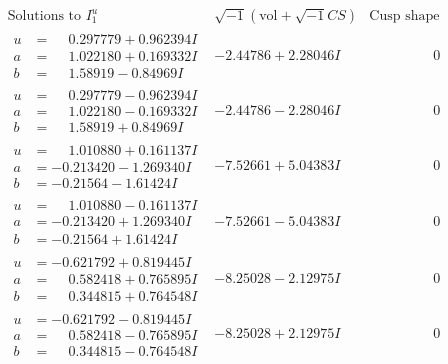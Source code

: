\documentclass[1p]{elsarticle_modified}
\theoremstyle{definition}
\newcommand{\I}{\sqrt{-1}}
\begin{document}
$$\begin{array}{c|c|c}  
\text{Solutions to }I^u_{1}& \I (\text{vol} + \sqrt{-1}CS) & \text{Cusp shape}\\
 \hline 
\begin{aligned}
u &= \phantom{-}0.297779 + 0.962394 I \\
a &= \phantom{-}1.022180 + 0.169332 I \\
b &= \phantom{-}1.58919 - 0.84969 I\end{aligned}
 & -2.44786 + 2.28046 I & \phantom{-0.000000 } 0 \\ \hline\begin{aligned}
u &= \phantom{-}0.297779 - 0.962394 I \\
a &= \phantom{-}1.022180 - 0.169332 I \\
b &= \phantom{-}1.58919 + 0.84969 I\end{aligned}
 & -2.44786 - 2.28046 I & \phantom{-0.000000 } 0 \\ \hline\begin{aligned}
u &= \phantom{-}1.010880 + 0.161137 I \\
a &= -0.213420 - 1.269340 I \\
b &= -0.21564 - 1.61424 I\end{aligned}
 & -7.52661 + 5.04383 I & \phantom{-0.000000 } 0 \\ \hline\begin{aligned}
u &= \phantom{-}1.010880 - 0.161137 I \\
a &= -0.213420 + 1.269340 I \\
b &= -0.21564 + 1.61424 I\end{aligned}
 & -7.52661 - 5.04383 I & \phantom{-0.000000 } 0 \\ \hline\begin{aligned}
u &= -0.621792 + 0.819445 I \\
a &= \phantom{-}0.582418 + 0.765895 I \\
b &= \phantom{-}0.344815 + 0.764548 I\end{aligned}
 & -8.25028 - 2.12975 I & \phantom{-0.000000 } 0 \\ \hline\begin{aligned}
u &= -0.621792 - 0.819445 I \\
a &= \phantom{-}0.582418 - 0.765895 I \\
b &= \phantom{-}0.344815 - 0.764548 I\end{aligned}
 & -8.25028 + 2.12975 I & \phantom{-0.000000 } 0 \\ \hline\begin{aligned}

\end{aligned}
\end{array}$$
\end{document}
